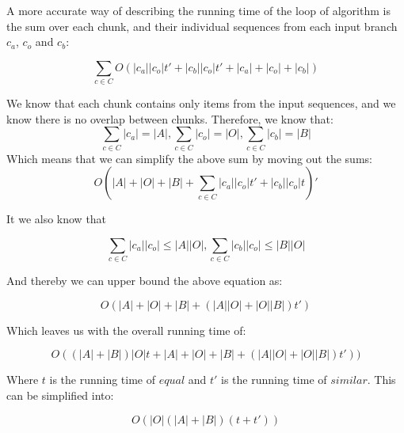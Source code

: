 \documentclass[11pt]{article}
\begin{document}
A more accurate way of describing the running time of the loop of algorithm is the sum over each chunk, and their individual sequences from each input branch $c_a$, $c_o$ and $c_b$:

\begin{equation}
\sum_{c \in C} O(|c_a||c_o|t' + |c_b||c_o|t' + |c_a|+|c_o|+|c_b|) \nonumber
\end{equation}

We know that each chunk contains only items from the input sequences, and we know there is no overlap between chunks. Therefore, we know that:
\begin{equation}
\sum_{c \in C} |c_a| = |A| \nonumber
, \sum_{c \in C} |c_o| = |O| \nonumber
, \sum_{c \in C} |c_b| = |B| \nonumber
\end{equation}
Which means that we can simplify the above sum by moving out the sums:
\begin{equation}
O(|A| + |O| + |B| + \sum_{c \in C} |c_a||c_o|t' + |c_b||c_o|t)' \nonumber
\end{equation}

It we also know that

\begin{equation}
\sum_{c \in C} |c_a||c_o| \leq |A||O| , 
\sum_{c \in C} |c_b||c_o| \leq |B||O| \nonumber
\end{equation}

And thereby we can upper bound the above equation as:

\begin{equation}
O(|A| + |O| + |B| + (|A| |O| + |O| |B|) t') \nonumber
\end{equation}

Which leaves us with the overall running time of:

\begin{equation}
O((|A| + |B|)|O|t + |A|+|O|+|B| + (|A| |O| + |O| |B|) t')) \nonumber
\end{equation}

Where $t$ is the running time of $equal$ and $t'$ is the running time of $similar$. This can be simplified into:

\begin{equation}
O(|O| (|A| + |B|)(t + t')) \nonumber
\end{equation}
\end{document}
